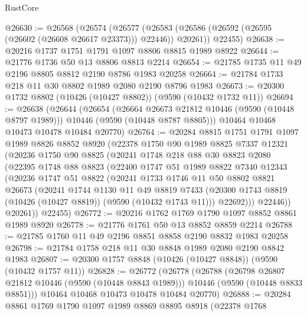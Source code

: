 \begin{lexlean}{RustCore}
\begin{coremodule}
@26630 := @26568
    (@26574
      (@26577 (@26583 (@26586 (@26592 (@26595 (@26602 (@26608 @26617 @23373))) @22446)) @20261))
      @22455)
@26638 := @20216 @1737 @1751 @1791 @1097 @8806 @8815 @1989 @8922
@26644 := @21776 @1736 @50 @13 @8806 @8813 @2214
@26654 := @21785 @1735 @11 @49 @2196 @8805 @8812 @2190 @8786 @1983 @20258
@26664 := @21784 @1733 @218 @11 @30 @8802 @1989 @2080 @2190 @8796 @1983
@26673 := @20300 @1732 @8802 (@10426 (@10427 @8802)) (@9590 (@10432 @1732 @11))
@26694 := @26638
    (@26644
      (@26654
        (@26664 @26673 @21812 @10446 (@9590 (@10448 @8797 @1989)))
        @10446
        (@9590 (@10448 @8787 @8805)))
      @10464
      @10468
      @10473
      @10478
      @10484
      @20770)
@26764 := @20284
    @8815
    @1751
    @1791
    @1097
    @1989
    @8826
    @8852
    @8920
    (@22378
      @1750
      @90
      @1989
      @8825
      @7337
      @12321
      (@20236
        @1750
        @90
        @8825
        (@20241
          @1748
          @218
          @88
          @30
          @8823
          @2080
          (@22395
            @1748
            @88
            @8823
            (@22400
              @1747
              @51
              @1989
              @8822
              @7340
              @12343
              (@20236
                @1747
                @51
                @8822
                (@20241
                  @1733
                  @1746
                  @11
                  @50
                  @8802
                  @8821
                  @26673
                  (@20241
                    @1744
                    @1130
                    @11
                    @49
                    @8819
                    @7433
                    (@20300 @1743 @8819 (@10426 (@10427 @8819)) (@9590 (@10432 @1743 @11)))
                    @22692)))
              @22446))
          @20261))
      @22455)
@26772 := @20216 @1762 @1769 @1790 @1097 @8852 @8861 @1989 @8920
@26778 := @21776 @1761 @50 @13 @8852 @8859 @2214
@26788 := @21785 @1760 @11 @49 @2196 @8851 @8858 @2190 @8832 @1983 @20258
@26798 := @21784 @1758 @218 @11 @30 @8848 @1989 @2080 @2190 @8842 @1983
@26807 := @20300 @1757 @8848 (@10426 (@10427 @8848)) (@9590 (@10432 @1757 @11))
@26828 := @26772
    (@26778
      (@26788
        (@26798 @26807 @21812 @10446 (@9590 (@10448 @8843 @1989)))
        @10446
        (@9590 (@10448 @8833 @8851)))
      @10464
      @10468
      @10473
      @10478
      @10484
      @20770)
@26888 := @20284
    @8861
    @1769
    @1790
    @1097
    @1989
    @8869
    @8895
    @8918
    (@22378
      @1768

\end{coremodule}
\end{lexlean}
